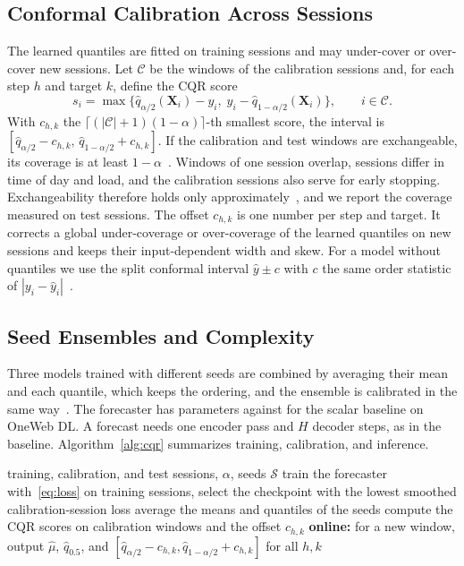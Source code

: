 \subsection{Conformal Calibration Across Sessions}
The learned quantiles are fitted on training sessions and may under-cover or over-cover new sessions. Let $\mathcal{C}$ be the windows of the calibration sessions and, for each step $h$ and target $k$, define the CQR score~\cite{romano2019conformalized}
\begin{equation}
s_i=\max\{\hat{q}_{\alpha/2}(\mathbf{X}_i)-y_i,\;y_i-\hat{q}_{1-\alpha/2}(\mathbf{X}_i)\},\qquad i\in\mathcal{C}.
\end{equation}
With $c_{h,k}$ the $\lceil(|\mathcal{C}|+1)(1-\alpha)\rceil$-th smallest score, the interval is $[\hat{q}_{\alpha/2}-c_{h,k},\,\hat{q}_{1-\alpha/2}+c_{h,k}]$. If the calibration and test windows are exchangeable, its coverage is at least $1-\alpha$~\cite{romano2019conformalized}. Windows of one session overlap, sessions differ in time of day and load, and the calibration sessions also serve for early stopping. Exchangeability therefore holds only approximately~\cite{barber2023conformal}, and we report the coverage measured on test sessions. The offset $c_{h,k}$ is one number per step and target. It corrects a global under-coverage or over-coverage of the learned quantiles on new sessions and keeps their input-dependent width and skew. For a model without quantiles we use the split conformal interval $\hat{y}\pm c$ with $c$ the same order statistic of $|y_i-\hat{y}_i|$~\cite{lei2018distribution}.

\subsection{Seed Ensembles and Complexity}
Three models trained with different seeds are combined by averaging their mean and each quantile, which keeps the ordering, and the ensemble is calibrated in the same way~\cite{lakshminarayanan2017simple}. The forecaster has \ParamsDist{} parameters against \ParamsPrev{} for the scalar baseline on OneWeb DL. A forecast needs one encoder pass and $H$ decoder steps, as in the baseline. Algorithm~\ref{alg:cqr} summarizes training, calibration, and inference.

\begin{algorithm}[t]
\caption{Training, calibration, and online use}
\label{alg:cqr}
\begin{algorithmic}[1]
\REQUIRE training, calibration, and test sessions, $\alpha$, seeds $\mathcal{S}$
  \STATE train the forecaster with~\eqref{eq:loss} on training sessions, select the checkpoint with the lowest smoothed calibration-session loss
\ENDFOR
\STATE average the means and quantiles of the seeds
  \STATE compute the CQR scores on calibration windows and the offset $c_{h,k}$
\ENDFOR
\STATE \textbf{online:} for a new window, output $\hat{\mu}$, $\hat{q}_{0.5}$, and $[\hat{q}_{\alpha/2}-c_{h,k},\hat{q}_{1-\alpha/2}+c_{h,k}]$ for all $h,k$
\end{algorithmic}
\end{algorithm}
